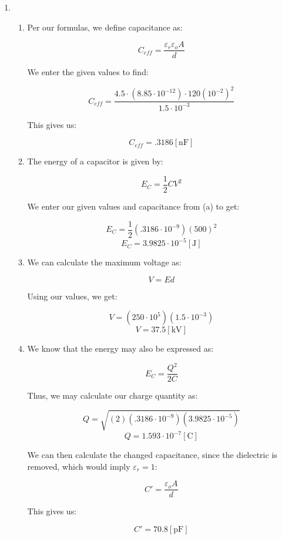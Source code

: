 \begin{enumerate}

  \item

    \begin{enumerate}

      \item Per our formulas, we define capacitance as:

        $$C_{eff}=\frac{\varepsilon_r\varepsilon_oA}{d}$$

        We enter the given values to find:

        $$C_{eff}=\frac{4.5\cdot(8.85\cdot10^{-12}) \cdot120(10^{-2})^2}{1.5\cdot10^{-3}}$$

        This gives us:

        $$\boxed{C_{eff}=.3186[\si{\nano\farad}]}$$

      \item The energy of a capacitor is given by:

        $$E_C=\frac{1}{2}CV^2$$

        We enter our given values and capacitance from (a) to get:

        $$E_C=\frac{1}{2}(.3186\cdot10^{-9})(500)^2$$
        $$\boxed{E_C=3.9825\cdot10^{-5}[\si{\joule}]}$$

      \item We can calculate the maximum voltage as:

        $$V=Ed$$

        Using our values, we get:

        $$V=(250\cdot10^{5})(1.5\cdot10^{-3})$$
        $$\boxed{V=37.5[\si{\kilo\volt}]}$$

      \item We know that the energy may also be expressed as:

        $$E_C=\frac{Q^2}{2C}$$

        Thus, we may calculate our charge quantity as:

        $$Q=\sqrt{(2)(.3186\cdot10^{-9})(3.9825\cdot10^{-5})}$$
        $$Q=1.593\cdot10^{-7}[\si{\coulomb}]$$

        We can then calculate the changed capacitance, since the dielectric is removed, which would imply $\varepsilon_r=1$:

        $$C\prime=\frac{\varepsilon_oA}{d}$$

        This gives us:

        $$C\prime=70.8[\si{\pico\farad}]$$


\end{enumerate}
\end{enumerate}
